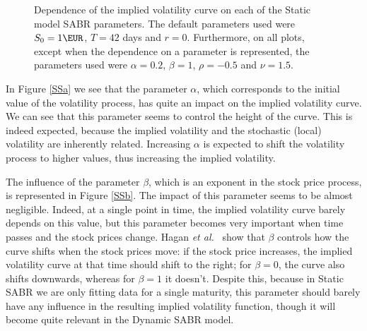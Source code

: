 \vspace{\fill}
\newpage

\begin{figure}[H]
  \begin{subfigmatrix}{2}
  \end{subfigmatrix}
  \caption[Dependence of the implied volatility curve on each of the Static SABR model parameters.]{Dependence of the implied volatility curve on each of the Static model SABR parameters. The default parameters used were $S_0=1\EUR$, $T=42$ days and $r=0$. Furthermore, on all plots, except when the dependence on a parameter is represented, the parameters used were $\alpha=0.2$, $\beta=1$, $\rho=-0.5$ and $\nu=1.5$.}
  \label{fig:SSparam}
\end{figure}

In Figure \autoref{SSa} we see that the parameter $\alpha$, which corresponds to the initial value of the volatility process, has quite an impact on the implied volatility curve. We can see that this parameter seems to control the height of the curve. This is indeed expected, because the implied volatility and the stochastic (local) volatility are inherently related. Increasing $\alpha$ is expected to shift the volatility process to higher values, thus increasing the implied volatility.

The influence of the parameter $\beta$, which is an exponent in the stock price process, is represented in Figure \autoref{SSb}. The impact of this parameter seems to be almost negligible. Indeed, at a single point in time, the implied volatility curve barely depends on this value, but this parameter becomes very important when time passes and the stock prices change. Hagan \textit{et al.}~\citep{Hagan} show that $\beta$ controls how the curve shifts when the stock prices move: if the stock price increases, the implied volatility curve at that time should shift to the right; for $\beta=0$, the curve also shifts downwards, whereas for $\beta=1$ it doesn't.
Despite this, because in Static SABR we are only fitting data for a single maturity, this parameter should barely have any influence in the resulting implied volatility function, though it will become quite relevant in the Dynamic SABR model.

